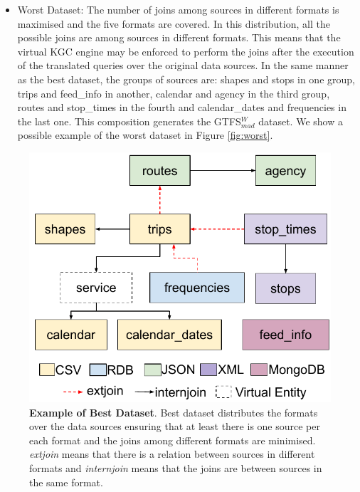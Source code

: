 \begin{enumerate}[label=\textbf{\arabic*})]
\begin{itemize}
        \item Worst Dataset: The number of joins among sources in different formats is maximised and the five formats are covered. In this distribution, all the possible joins are among sources in different formats. This means that the virtual KGC engine may be enforced to perform the joins after the execution of the translated queries over the original data sources. In the same manner as the best dataset, the groups of sources are: shapes and stops in one group, trips and feed\_info in another, calendar and agency in the third group, routes and stop\_times in the fourth and calendar\_dates and frequencies in the last one. This composition generates the GTFS$_{mad}^{W}$ dataset. We show a possible example of the worst dataset in Figure \ref{fig:worst}. 
    \end{itemize}
   
\end{enumerate}
 

\begin{figure}[h]
    \centering
    \includegraphics[width=0.85\linewidth]{figures/best-dist.pdf}
    \caption[Example of best dataset]{\textbf{Example of Best Dataset}. Best dataset distributes the formats over the data sources ensuring that at least there is one source per each format and the joins among different formats are minimised. \textit{extjoin} means that there is a relation between sources in different formats and \textit{internjoin} means that the joins are between sources in the same format.}
    \label{fig:best}
\end{figure}



